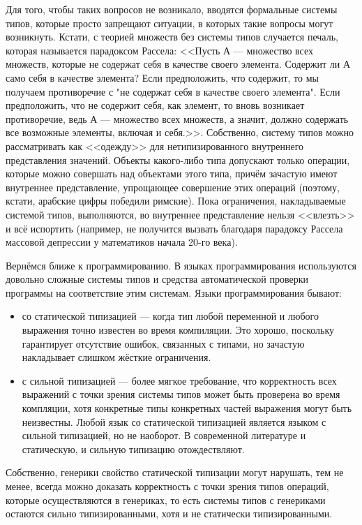 \documentclass[a5paper]{article}
\begin{document}
Для того, чтобы таких вопросов не возникало, вводятся формальные системы типов, которые просто запрещают ситуации, в которых такие вопросы могут возникнуть. Кстати, с теорией множеств без системы типов случается печаль, которая называется парадоксом Рассела: <<Пусть А --- множество всех множеств, которые не содержат себя в качестве своего элемента. Содержит ли А само себя в качестве элемента? Если предположить, что содержит, то мы получаем противоречие с "не содержат себя в качестве своего элемента". Если предположить, что  не содержит себя, как элемент, то вновь возникает противоречие, ведь А — множество всех множеств, а значит, должно содержать все возможные элементы, включая и себя.>>. Собственно, систему типов можно рассматривать как <<одежду>> для нетипизированного внутреннего представления значений. Объекты какого-либо типа допускают только операции, которые можно совершать над объектами этого типа, причём зачастую имеют внутреннее представление, упрощающее совершение этих операций (поэтому, кстати, арабские цифры победили римские). Пока ограничения, накладываемые системой типов, выполняются, во внутреннее представление нельзя <<влезть>> и всё испортить (например, не получится вызвать благодаря парадоксу Рассела массовой депрессии у математиков начала 20-го века).

Вернёмся ближе к программированию. В языках программирования используются довольно сложные системы типов и средства автоматической проверки программы на соответствие этим системам. Языки программирования бывают:

\begin{itemize}
    \item со статической типизацией --- когда тип любой переменной и любого выражения точно известен во время компиляции. Это хорошо, поскольку гарантирует отсутствие ошибок, связанных с типами, но зачастую накладывает слишком жёсткие ограничения.
    \item с сильной типизацией --- более мягкое требование, что корректность всех выражений с точки зрения системы типов может быть проверена во время компляции, хотя конкретные типы конкретных частей выражения могут быть неизвестны. Любой язык со статической типизацией является языком с сильной типизацией, но не наоборот. В современной литературе и статическую, и сильную типизацию отождествляют.
\end{itemize}

Собственно, генерики свойство статической типизации могут нарушать, тем не менее, всегда можно доказать корректность с точки зрения типов операций, которые осуществляются в генериках, то есть системы типов с генериками остаются сильно типизированными, хотя и не статически типизированными.
\end{document}
